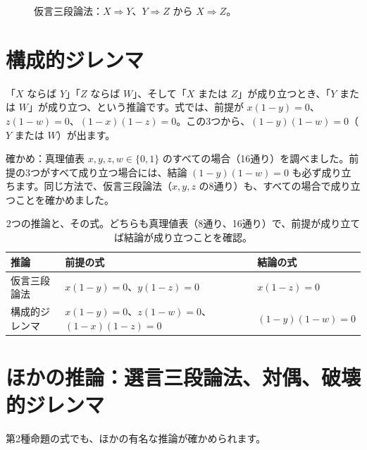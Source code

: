 \documentclass[a4paper,11pt,openany]{ltjsbook}
\begin{document}
\begin{figure}[htbp]
\centering
{}
\caption{仮言三段論法：$X\Rightarrow Y$、$Y\Rightarrow Z$ から $X\Rightarrow Z$。}
\end{figure}

\section{構成的ジレンマ}

「$X$ ならば $Y$」「$Z$ ならば $W$」、そして「$X$ または $Z$」が成り立つとき、「$Y$ または $W$」が成り立つ、という推論です。式では、前提が $x(1-y)=0$、$z(1-w)=0$、$(1-x)(1-z)=0$。この3つから、$(1-y)(1-w)=0$（$Y$ または $W$）が出ます。

\begin{examplebox}{確かめ：真理値表}
$x,y,z,w\in\{0,1\}$ のすべての場合（16通り）を調べました。前提の3つがすべて成り立つ場合には、結論 $(1-y)(1-w)=0$ も必ず成り立ちます。同じ方法で、仮言三段論法（$x,y,z$ の8通り）も、すべての場合で成り立つことを確かめました。
\end{examplebox}

\begin{table}[htbp]
\centering
\begin{tabular}{lll}
\toprule
推論 & 前提の式 & 結論の式\\
\midrule
仮言三段論法 & $x(1-y)=0$、$y(1-z)=0$ & $x(1-z)=0$\\
構成的ジレンマ & $x(1-y)=0$、$z(1-w)=0$、$(1-x)(1-z)=0$ & $(1-y)(1-w)=0$\\
\bottomrule
\end{tabular}
\caption{2つの推論と、その式。どちらも真理値表（8通り、16通り）で、前提が成り立てば結論が成り立つことを確認。}
\end{table}

\section{ほかの推論：選言三段論法、対偶、破壊的ジレンマ}

第2種命題の式でも、ほかの有名な推論が確かめられます。
\end{document}
